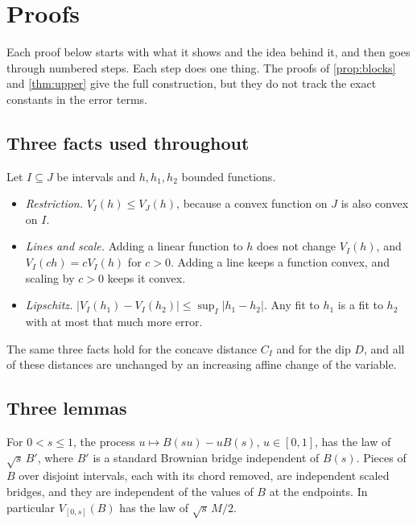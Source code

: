 \section{Proofs}\label{app:proofs}

Each proof below starts with what it shows and the idea behind it, and then goes through numbered steps. Each step does one thing. The proofs of \cref{prop:blocks} and \cref{thm:upper} give the full construction, but they do not track the exact constants in the error terms.

\subsection{Three facts used throughout}
Let $I\subseteq J$ be intervals and $h,h_1,h_2$ bounded functions.
\begin{itemize}[leftmargin=*]
\item \emph{Restriction.} $V_I(h)\le V_J(h)$, because a convex function on $J$ is also convex on $I$.
\item \emph{Lines and scale.} Adding a linear function to $h$ does not change $V_I(h)$, and $V_I(ch)=cV_I(h)$ for $c>0$. Adding a line keeps a function convex, and scaling by $c>0$ keeps it convex.
\item \emph{Lipschitz.} $|V_I(h_1)-V_I(h_2)|\le\sup_I|h_1-h_2|$. Any fit to $h_1$ is a fit to $h_2$ with at most that much more error.
\end{itemize}
The same three facts hold for the concave distance $C_I$ and for the dip $D$, and all of these distances are unchanged by an increasing affine change of the variable.

\subsection{Three lemmas}

\begin{lemma}\label{lem:pieces}
For $0<s\le1$, the process $u\mapsto B(su)-uB(s)$, $u\in[0,1]$, has the law of $\sqrt s\,B'$, where $B'$ is a standard Brownian bridge independent of $B(s)$. Pieces of $B$ over disjoint intervals, each with its chord removed, are independent scaled bridges, and they are independent of the values of $B$ at the endpoints. In particular $V_{[0,s]}(B)$ has the law of $\sqrt s\,M/2$.
\end{lemma}


